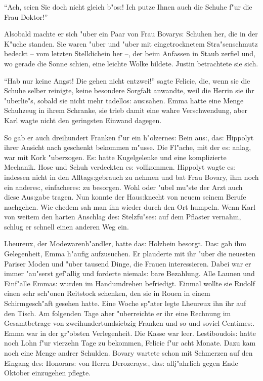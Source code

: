 \documentclass[oneside,12pt]{book}
\newcommand{\s}{s:}%
\begin{document}
"`Ach, seien Sie doch nicht gleich b"o{\s}! Ich putze Ihnen auch
die Schuhe f"ur die Frau Doktor!"'

Alsobald machte er sich "uber ein Paar von Frau Bovary{\s} Schuhen
her, die in der K"uche standen. Sie waren "uber und "uber mit
eingetrocknetem Stra"senschmutz bedeckt -- vom letzten
Stelldichein her --, der beim Anfassen in Staub zerfiel und, wo
gerade die Sonne schien, eine leichte Wolke bildete. Justin
betrachtete sie sich.

"`Hab nur keine Angst! Die gehen nicht ent\/zwei!"' sagte Felicie,
die, wenn sie die Schuhe selber reinigte, keine besondere Sorgfalt
anwandte, weil die Herrin sie ihr "uberlie"s, sobald sie nicht
mehr tadello{\s} au{\s}sahen. Emma hatte eine Menge Schuhzeug in
ihrem Schranke, sie trieb damit eine wahre Verschwendung, aber
Karl wagte nicht den geringsten Einwand dagegen.

So gab er auch dreihundert Franken f"ur ein h"olzerne{\s} Bein
au{\s}, da{\s} Hippolyt ihrer Ansicht nach geschenkt bekommen
m"usse. Die Fl"ache, mit der e{\s} anlag, war mit Kork "uberzogen.
E{\s} hatte Kugelgelenke und eine komplizierte Mechanik. Hose und
Schuh verdeckten e{\s} vollkommen. Hippolyt wagte e{\s} indessen
nicht in den Alltag{\s}gebrauch zu nehmen und bat Frau Bovary, ihm
noch ein andere{\s}, einfachere{\s} zu besorgen. Wohl oder "ubel
mu"ste der Arzt auch diese Au{\s}gabe tragen. Nun konnte der
Hau{\s}knecht von neuem seinem Berufe nachgehen. Wie ehedem sah
man ihn wieder durch den Ort humpeln. Wenn Karl von weitem den
harten Anschlag de{\s} Stelzfu"se{\s} auf dem Pflaster vernahm,
schlug er schnell einen anderen Weg ein.

Lheureux, der Modewarenh"andler, hatte da{\s} Holzbein besorgt.
Da{\s} gab ihm Gelegenheit, Emma h"aufig aufzusuchen. Er plauderte
mit ihr "uber die neuesten Pariser Moden und "uber tausend Dinge,
die Frauen interessieren. Dabei war er immer "au"serst gef"allig
und forderte niemal{\s} bare Bezahlung. Alle Launen und Einf"alle
Emma{\s} wurden im Handumdrehen befriedigt. Einmal wollte sie
Rudolf einen sehr sch"onen Reitstock schenken, den sie in Rouen in
einem Schirmgesch"aft gesehen hatte. Eine Woche sp"ater legte
Lheureux ihn ihr auf den Tisch. Am folgenden Tage aber
"uberreichte er ihr eine Rechnung im Gesamtbetrage von
zweihundertundsiebzig Franken und so und soviel Centime{\s}. Emma
war in der gr"obsten Verlegenheit. Die Kasse war leer.
Lestiboudoi{\s} hatte noch Lohn f"ur vierzehn Tage zu bekommen,
Felicie f"ur acht Monate. Dazu kam noch eine Menge andrer
Schulden. Bovary wartete schon mit Schmerzen auf den Eingang
de{\s} Honorar{\s} von Herrn Derozeray{\s}, da{\s} allj"ahrlich
gegen Ende Oktober einzugehen pflegte.
\end{document}
